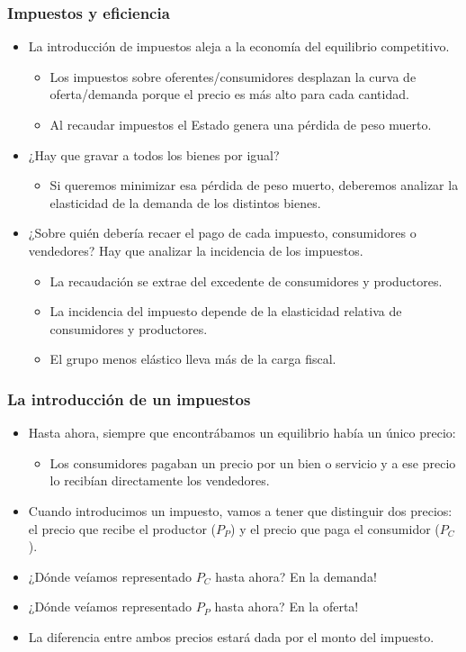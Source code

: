 \documentclass{beamer}
\begin{document}
\begin{frame}
\frametitle{Impuestos y eficiencia}
\begin{itemize}
    \item La introducción de impuestos aleja a la economía del equilibrio competitivo. 
    \begin{itemize}
        \item Los impuestos sobre oferentes/consumidores desplazan la curva de oferta/demanda porque el precio es más alto para cada cantidad.
        \item Al recaudar impuestos el Estado genera una pérdida de peso muerto. 
    \end{itemize}
    \vspace{1mm}
    \item ¿Hay que gravar a todos los bienes por igual?
        \begin{itemize}
        \item Si queremos minimizar esa pérdida de peso muerto, deberemos analizar la elasticidad de la demanda de los distintos bienes.
    \vspace{1mm}
    \end{itemize}
    \item  ¿Sobre quién debería recaer el pago de cada impuesto, consumidores o vendedores? Hay que analizar la incidencia de los impuestos.
    \begin{itemize}
        \item La recaudación se extrae del excedente de consumidores y productores.
        \item La incidencia del impuesto depende de la elasticidad relativa de consumidores y productores.
        \item El grupo menos elástico lleva más de la carga fiscal. 
    \end{itemize}
\end{itemize}
\end{frame}

\begin{frame}
\frametitle{La introducción de un impuestos}
\begin{itemize}
    \item Hasta ahora, siempre que encontrábamos un equilibrio había un único precio:
    \begin{itemize}
    \item Los consumidores pagaban un precio por un bien o servicio y a ese precio lo recibían directamente los vendedores. 
\end{itemize}   
    \item Cuando introducimos un impuesto, vamos a tener que distinguir dos precios: el precio que recibe el productor ($P_P$) y el precio que paga el consumidor ($P_C$).
    \item ¿Dónde veíamos representado $P_C$ hasta ahora? En la demanda!
    \item ¿Dónde veíamos representado $P_P$ hasta ahora? En la oferta!
    \item La diferencia entre ambos precios estará dada por el monto del impuesto. 

\end{itemize}    
\end{frame}
\end{document}
